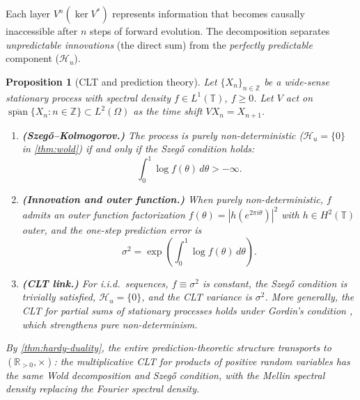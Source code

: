\documentclass[12pt]{amsart}
\newtheorem{proposition}[theorem]{Proposition}
\theoremstyle{definition}
\theoremstyle{remark}
\newcommand{\Rpos}{\mathbb{R}_{>0}}
\newcommand{\bT}{\mathbb{T}}
\newcommand{\Z}{\mathbb{Z}}
\newcommand{\Htwo}{H^2}
\begin{document}
Each layer $V^n(\ker V^*)$ represents information that becomes causally inaccessible after $n$ steps of forward evolution. The decomposition separates \emph{unpredictable innovations} (the direct sum) from the \emph{perfectly predictable} component ($\mathcal{H}_u$).

\begin{proposition}[CLT and prediction theory]\label{prop:clt-prediction}
Let $\{X_n\}_{n \in \Z}$ be a wide-sense stationary process with spectral density $f \in L^1(\bT)$, $f \geq 0$. Let $V$ act on $\overline{\operatorname{span}}\{X_n : n \in \Z\} \subset L^2(\Omega)$ as the time shift $VX_n = X_{n+1}$.
\begin{enumerate}[label=(\roman*)]
\item \textbf{(Szeg\H{o}--Kolmogorov.)} The process is purely non-deterministic ($\mathcal{H}_u = \{0\}$ in \cref{thm:wold}) if and only if the \emph{Szeg\H{o} condition} holds:
\[
\int_0^1 \log f(\theta)\, d\theta > -\infty.
\]

\item \textbf{(Innovation and outer function.)} When purely non-deterministic, $f$ admits an outer function factorization $f(\theta) = |h(e^{2\pi i\theta})|^2$ with $h \in \Htwo(\bT)$ outer, and the one-step prediction error is
\[
\sigma^2 = \exp\left(\int_0^1 \log f(\theta)\, d\theta\right).
\]

\item \textbf{(CLT link.)} For i.i.d.\ sequences, $f \equiv \sigma^2$ is constant, the Szeg\H{o} condition is trivially satisfied, $\mathcal{H}_u = \{0\}$, and the CLT variance is $\sigma^2$. More generally, the CLT for partial sums of stationary processes holds under Gordin's condition \cite[Theorem~35.5]{Billingsley}, which strengthens pure non-determinism.
\end{enumerate}
By \cref{thm:hardy-duality}, the entire prediction-theoretic structure transports to $(\Rpos, \times)$: the multiplicative CLT for products of positive random variables has the same Wold decomposition and Szeg\H{o} condition, with the Mellin spectral density replacing the Fourier spectral density.
\end{proposition}
\end{document}
